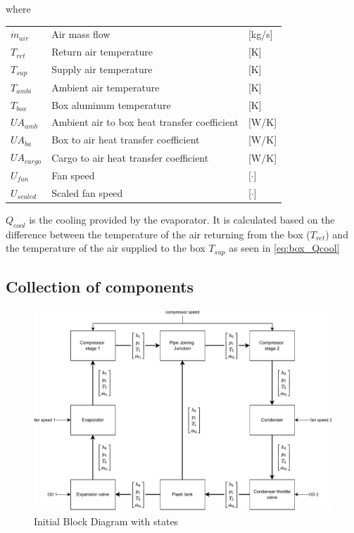 where
\begin{center}
	\begin{tabular}{l p{8cm} l}
		$\dot{m}_{air}$ & Air mass flow                                & [\si{kg}/{\si{s}}] \\
		$T_{ret}$       & Return air temperature                       & [\si{K}]           \\
		$T_{sup}$       & Supply air temperature                       & [\si{K}]           \\
		$T_{ambi}$      & Ambient air temperature                      & [\si{K}]           \\
		$T_{box}$       & Box aluminum temperature                     & [\si{K}]           \\
		$U A_{amb}$     & Ambient air to box heat transfer coefficient & [\si{W}/\si{K}]    \\
		$U A_{ba}$      & Box to air heat transfer coefficient         & [\si{W}/\si{K}]    \\
		$U A_{cargo}$   & Cargo to air heat transfer coefficient       & [\si{W}/\si{K}]    \\
		$U_{fan}$       & Fan speed                                    & [$\cdot$]          \\
		$U_{scaled}$    & Scaled fan speed                             & [$\cdot$]
	\end{tabular}
\end{center}

$Q_{cool}$ is the cooling provided by the evaporator. It is calculated based on the difference between the temperature of the air returning from the box ($T_{ret}$) and the temperature of the air supplied to the box $T_{sup}$ as seen in \cref{eq:box_Qcool}

\clearpage
\newpage
\subsection{Collection of components}

\begin{figure}[h!]
	\centering
	\includegraphics[width=1\textwidth]{Graphics/Block_Diagram.pdf}
	\caption{Initial Block Diagram with states}
	\label{fig:Block_diagram}
\end{figure}



